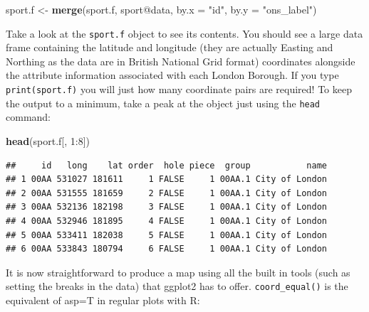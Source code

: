 \documentclass[]{article}
\newenvironment{Shaded}{}{}
\newcommand{\KeywordTok}[1]{\textcolor[rgb]{0.00,0.44,0.13}{\textbf{{#1}}}}
\newcommand{\DataTypeTok}[1]{\textcolor[rgb]{0.56,0.13,0.00}{{#1}}}
\newcommand{\DecValTok}[1]{\textcolor[rgb]{0.25,0.63,0.44}{{#1}}}
\newcommand{\StringTok}[1]{\textcolor[rgb]{0.25,0.44,0.63}{{#1}}}
\newcommand{\NormalTok}[1]{{#1}}
\begin{document}
\begin{Shaded}
\begin{Highlighting}[]
\NormalTok{sport.f <- }\KeywordTok{merge}\NormalTok{(sport.f, sport@data, }\DataTypeTok{by.x =} \StringTok{"id"}\NormalTok{, }\DataTypeTok{by.y =} \StringTok{"ons_label"}\NormalTok{)}
\end{Highlighting}
\end{Shaded}
Take a look at the \texttt{sport.f} object to see its contents. You
should see a large data frame containing the latitude and longitude
(they are actually Easting and Northing as the data are in British
National Grid format) coordinates alongside the attribute information
associated with each London Borough. If you type \texttt{print(sport.f)}
you will just how many coordinate pairs are required! To keep the output
to a minimum, take a peak at the object just using the \texttt{head}
command:

\begin{Shaded}
\begin{Highlighting}[]
\KeywordTok{head}\NormalTok{(sport.f[, }\DecValTok{1}\NormalTok{:}\DecValTok{8}\NormalTok{])}
\end{Highlighting}
\end{Shaded}
\begin{verbatim}
##     id   long    lat order  hole piece  group           name
## 1 00AA 531027 181611     1 FALSE     1 00AA.1 City of London
## 2 00AA 531555 181659     2 FALSE     1 00AA.1 City of London
## 3 00AA 532136 182198     3 FALSE     1 00AA.1 City of London
## 4 00AA 532946 181895     4 FALSE     1 00AA.1 City of London
## 5 00AA 533411 182038     5 FALSE     1 00AA.1 City of London
## 6 00AA 533843 180794     6 FALSE     1 00AA.1 City of London
\end{verbatim}
It is now straightforward to produce a map using all the built in tools
(such as setting the breaks in the data) that ggplot2 has to offer.
\texttt{coord\_equal()} is the equivalent of asp=T in regular plots with
R:
\end{document}
